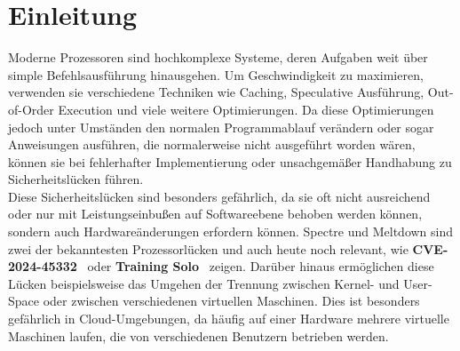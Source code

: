 \section[Einleitung]{Einleitung}
\label{sec:einleitung}
Moderne Prozessoren sind hochkomplexe Systeme, deren Aufgaben weit über simple Befehlsausführung hinausgehen.
Um Geschwindigkeit zu maximieren, verwenden sie verschiedene Techniken wie Caching, Speculative Ausführung, Out-of-Order Execution und viele weitere Optimierungen.
Da diese Optimierungen jedoch unter Umständen den normalen Programmablauf verändern oder sogar Anweisungen ausführen, die normalerweise nicht ausgeführt worden wären, können sie bei fehlerhafter Implementierung oder unsachgemäßer Handhabung zu Sicherheitslücken führen.\\
Diese Sicherheitslücken sind besonders gefährlich, da sie oft nicht ausreichend oder nur mit Leistungseinbußen auf Softwareebene behoben werden können, sondern auch Hardwareänderungen erfordern können.
Spectre und Meltdown sind zwei der bekanntesten Prozessorlücken und auch heute noch relevant, wie  \textbf{CVE-2024-45332}~\cite{cve_2024_45332,bprc_sec25} oder \textbf{Training Solo}~\cite{training_solo} zeigen.
Darüber hinaus ermöglichen diese Lücken beispielsweise das Umgehen der Trennung zwischen Kernel- und User-Space oder zwischen verschiedenen virtuellen Maschinen.
Dies ist besonders gefährlich in Cloud-Umgebungen, da häufig auf einer Hardware mehrere virtuelle Maschinen laufen, die von verschiedenen Benutzern betrieben werden.